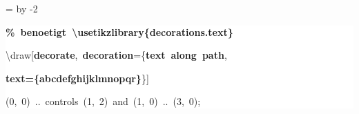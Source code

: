 \begingroup
\ttfamily
{}
=\textwidth
\advance{} by -2\fboxsep
\noindent
\colorbox{background}
{%
\parbox{\dimen255}
{%
\rule[-0.5ex]{0pt}{2.5ex}\hspace*{0.0em}\textcolor{G}{\textbf{\%~benoetigt~\textbackslash{}usetikzlibrary\{decorations.text\}}}\\
\rule[-0.5ex]{0pt}{2.5ex}\hspace*{0.0em}\textbackslash{}draw[\textcolor{R}{\textbf{decorate}},~\textcolor{R}{\textbf{decoration}}=\{\textcolor{R}{\textbf{text~along~path}},\\
\rule[-0.5ex]{0pt}{2.5ex}\hspace*{14.0em}\textcolor{R}{\textbf{text=\{abcdefghijklmnopqr\}}}\}]\\
\rule[-0.5ex]{0pt}{2.5ex}\hspace*{2.5em}(0,~0)~..~controls~(1,~2)~and~(1,~0)~..~(3,~0);}%
}%
\endgroup
